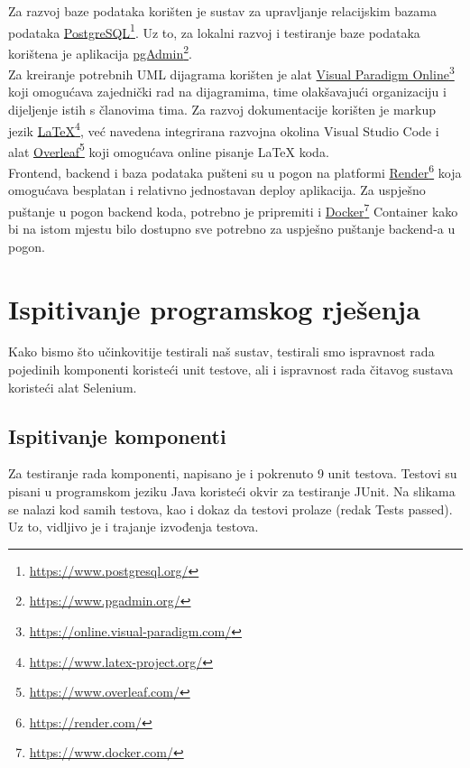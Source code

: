             Za razvoj baze podataka korišten je sustav za upravljanje relacijskim bazama podataka \underline{PostgreSQL}\footnote{\url{https://www.postgresql.org/}}. Uz to, za lokalni razvoj i testiranje baze podataka korištena je aplikacija \underline{pgAdmin}\footnote{\url{https://www.pgadmin.org/}}. \\

            Za kreiranje potrebnih UML dijagrama korišten je alat \underline{Visual Paradigm Online}\footnote{\url{https://online.visual-paradigm.com/}} koji omogućava zajednički rad na dijagramima, time olakšavajući organizaciju i dijeljenje istih s članovima tima. Za razvoj dokumentacije korišten je markup jezik \underline{LaTeX}\footnote{\url{https://www.latex-project.org/}}, već navedena integrirana razvojna okolina Visual Studio Code i alat \underline{Overleaf}\footnote{\url{https://www.overleaf.com/}} koji omogućava online pisanje LaTeX koda.\\

            Frontend, backend i baza podataka pušteni su u pogon na platformi \underline{Render}\footnote{\url{https://render.com/}} koja omogućava besplatan i relativno jednostavan deploy aplikacija. Za uspješno puštanje u pogon backend koda, potrebno je pripremiti i \underline{Docker}\footnote{\url{https://www.docker.com/}} Container kako bi na istom mjestu bilo dostupno sve potrebno za uspješno puštanje backend-a u pogon. \\
		
			\eject 
		
	
		\section{Ispitivanje programskog rješenja}
			
			
			 Kako bismo što učinkovitije testirali naš sustav, testirali smo ispravnost rada pojedinih komponenti koristeći unit testove, ali i ispravnost rada čitavog sustava koristeći alat Selenium.
	
			
			\subsection{Ispitivanje komponenti}

                Za testiranje rada komponenti, napisano je i pokrenuto 9 unit testova. Testovi su pisani u programskom jeziku Java koristeći okvir za testiranje JUnit. Na slikama se nalazi kod samih testova, kao i dokaz da testovi prolaze (redak Tests passed). Uz to, vidljivo je i trajanje izvođenja testova.\\
                
